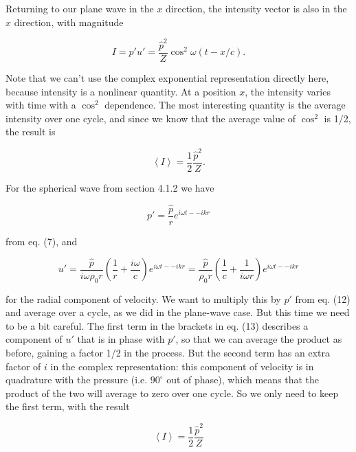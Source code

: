   Returning to our plane wave in the $x$ direction, the intensity vector is 
  also in the $x$ direction, with magnitude 

  \begin{equation*}I=p' u' = \dfrac{\hat{p}^2}{Z} \cos^2{\omega (t-x/c)} . 
  \tag{10}\end{equation*} 

  Note that we can't use the complex exponential representation directly here, 
  because intensity is a nonlinear quantity. At a position $x$, the intensity 
  varies with time with a $\cos^2$ dependence. The most interesting quantity is 
  the average intensity over one cycle, and since we know that the average 
  value of $\cos^2$ is 1/2, the result is 

  \begin{equation*}\left< I \right> =\frac{1}{2} \frac{\hat{p}^2}{Z} . 
  \tag{11}\end{equation*} 

  For the spherical wave from section 4.1.2 we have 

  \begin{equation*}p'=\frac{\hat{p}}{r} e^{i \omega t -- i k r} 
  \tag{12}\end{equation*} 

  \noindent{}from eq. (7), and 

  \begin{equation*}u' = \frac{\hat{p}}{i\omega \rho_0 r} \left( \frac{1}{r} 
  +\frac{i \omega}{c} \right) e^{i\omega t -- ikr} = \frac{\hat{p}}{\rho_0 r} 
  \left(\frac{1}{c} + \frac{1}{i \omega r}\right) e^{i\omega t -- 
  ikr}\tag{13}\end{equation*} 

  \noindent{}for the radial component of velocity. We want to multiply this by 
  $p'$ from eq. (12) and average over a cycle, as we did in the plane-wave 
  case. But this time we need to be a bit careful. The first term in the 
  brackets in eq. (13) describes a component of $u'$ that is in phase with 
  $p'$, so that we can average the product as before, gaining a factor 1/2 in 
  the process. But the second term has an extra factor of $i$ in the complex 
  representation: this component of velocity is in quadrature with the pressure 
  (i.e. $90^\circ$ out of phase), which means that the product of the two will 
  average to zero over one cycle. So we only need to keep the first term, with 
  the result 

  \begin{equation*}\left< I \right> =\frac{1}{2} \frac{\hat{p}^2}{Z} 
  \tag{14}\end{equation*} 

